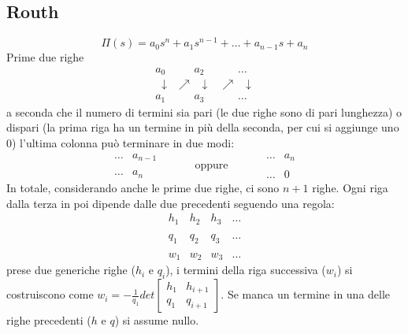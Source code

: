     \subsection{Routh}
    \[
        \Pi(s) = a_0s^n + a_1 s^{n-1} + \dots + a_{n-1}s + a_n
    \]
    Prime due righe
    \[
        \begin{matrix}
            a_0 & \;\;\;\;\;\; a_2 & \;\;\;\;\;\;\dots\\
            \;\;\downarrow & \nearrow \;\; \downarrow & \nearrow \;\; \downarrow\\
            a_1 & \;\;\;\;\;\; a_3 & \;\;\;\;\;\;\dots 
        \end{matrix}
    \]
    a seconda che il numero di termini sia pari (le due righe sono di pari lunghezza) o dispari (la prima riga ha un termine in più della seconda, per cui si aggiunge uno $0$) l'ultima colonna può terminare in due modi:
    \[
        \begin{matrix}
            \dots & a_{n-1}\\
            \;\\
            \dots & a_n
        \end{matrix}\;\;\;\;\;\;\;\;\;\;\; \text{oppure}\;\;\;\;\;\;\;\;\;\;\; \begin{matrix}
            \dots &a_n\\
            \;\\
            \dots & 0 
        \end{matrix}
    \]
    In totale, considerando anche le prime due righe, ci sono $n+1$ righe.\newline
    Ogni riga dalla terza in poi dipende dalle due precedenti seguendo una regola:
    \[
        \begin{matrix}
            h_1 & h_2 & h_3 &\dots\\
            \;\\
            q_1 & q_2 & q_3 & \dots\\
            \;\\
            w_1 & w_2 & w_3 & \dots
        \end{matrix}
    \]
    prese due generiche righe ($h_i$ e $q_i$), i termini della riga successiva ($w_i$) si costruiscono come $w_i = - \frac{1}{q_1} det\left[\begin{matrix}
        h_1 & h_{i+1} \\
        q_1 & q_{i+1}
    \end{matrix}\right]$.\newline
    Se manca un termine in una delle righe precedenti ($h$ e $q$) si assume nullo.\newline
